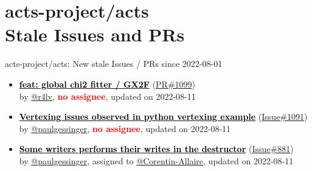\section{ acts-project/acts \\ Stale Issues and PRs}
\begin{frame}[allowframebreaks]{ acts-project/acts: New stale Issues / PRs since 2022-08-01 }
  \begin{itemize}
    
    \item\propen\prwip\prstale
    \hspace*{0.1em}
    \textbf{\href{https://github.com/acts-project/acts/pull/1099}{\textcolor{black}{feat: global chi2 fitter / GX2F}}}
    (\href{https://github.com/acts-project/acts/pull/1099}{PR\#1099}) \\
    by \href{https://github.com/r4lv}{@r4lv}, {}\textbf{\textcolor{Red}{no assignee}}, updated on 2022-08-11

    \item\iss\prstale
    \hspace*{0.1em}
    \textbf{\href{https://github.com/acts-project/acts/issues/1091}{\textcolor{black}{Vertexing issues observed in python vertexing example}}}
    (\href{https://github.com/acts-project/acts/issues/1091}{Issue\#1091}) \\
    by \href{https://github.com/paulgessinger}{@paulgessinger}, {}\textbf{\textcolor{Red}{no assignee}}, updated on 2022-08-11

    \item\iss\prstale
    \hspace*{0.1em}
    \textbf{\href{https://github.com/acts-project/acts/issues/881}{\textcolor{black}{Some writers performs their writes in the destructor}}}
    (\href{https://github.com/acts-project/acts/issues/881}{Issue\#881}) \\
    by \href{https://github.com/paulgessinger}{@paulgessinger}, {}assigned to \href{https://github.com/Corentin-Allaire}{@Corentin-Allaire}, updated on 2022-08-11

  \end{itemize}
\end{frame}



